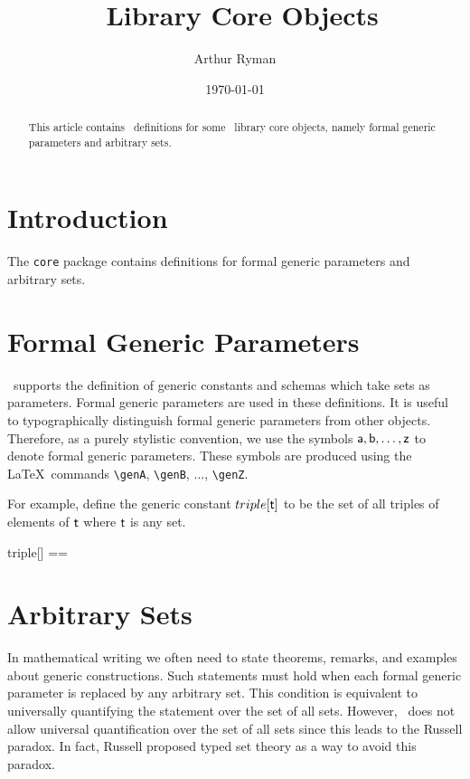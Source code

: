 \documentclass{amsart}
\begin{document}
\title{\mathz\ Library Core Objects}
\author{Arthur Ryman}
\date{\today}

\begin{abstract}
This article contains \ZN\ definitions for some  \mathz\ library core objects,
namely formal generic parameters and arbitrary sets.
\end{abstract}

\maketitle

\tableofcontents

\section{Introduction}

The \texttt{core} package contains definitions for formal generic parameters and arbitrary sets.

\section{Formal Generic Parameters}

\ZN\ supports the definition of generic constants and schemas which take sets as parameters.
Formal generic parameters are used in these definitions.
It is useful to typographically distinguish formal generic parameters from other objects.
Therefore, as a purely stylistic convention, we use the symbols $\mathsf{a}, \mathsf{b}, \dots, \mathsf{z}$ to denote formal generic parameters.
These symbols are produced using the \LaTeX\ commands \verb|\genA|, \verb|\genB|, $\dots$, \verb|\genZ|.

For example, define the generic constant $triple[\mathsf{t}]$ to be the set of all triples of elements of $\mathsf{t}$ 
where $\mathsf{t}$ is any set.
\begin{zed}
	triple[\genT] == \genT \cross \genT \cross \genT
\end{zed}

\section{Arbitrary Sets}

In mathematical writing we often need to state theorems, remarks, and examples about generic constructions.
Such statements must hold when each formal generic parameter is replaced by any arbitrary set.
This condition is equivalent to universally quantifying the statement over the set of all sets.
However, \ZN\ does not allow universal quantification over the set of all sets since this leads to the Russell paradox.
In fact, Russell proposed typed set theory as a way to avoid this paradox.
\end{document}
